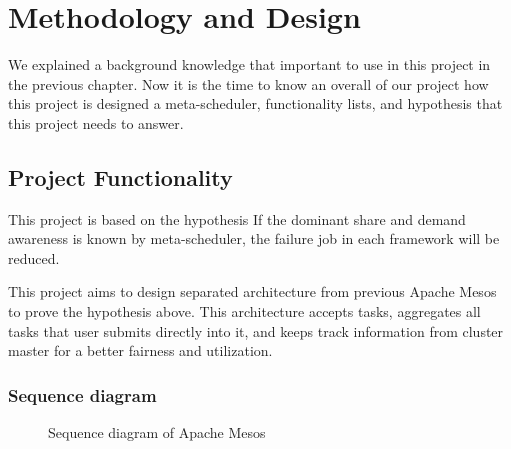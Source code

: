 \documentclass[12pt,oneside,openright,a4paper]{cpe-english-project}
\begin{document}
\chapter{Methodology and Design}

We explained a background knowledge that important to use in this project in the previous chapter. Now it is the time to know an overall of our project how this project is designed a meta-scheduler, functionality lists, and hypothesis that this project needs to answer.

\section{Project Functionality}
This project is based on the hypothesis If the dominant share and demand awareness is known by meta-scheduler, the failure job in each framework will be reduced.

This project aims to design separated architecture from previous Apache Mesos to prove the hypothesis above. This architecture accepts tasks, aggregates all tasks that user submits directly into it, and keeps track information from cluster master for a better fairness and utilization.

\subsection{Sequence diagram} 
\begin{figure}[!h]\centering
  \setlength{\fboxrule}{0mm} %
  \setlength{\fboxsep}{0cm}
  \caption{Sequence diagram of Apache Mesos}\label{fig:SequenceDiagram}
\end{figure}
\end{document}
